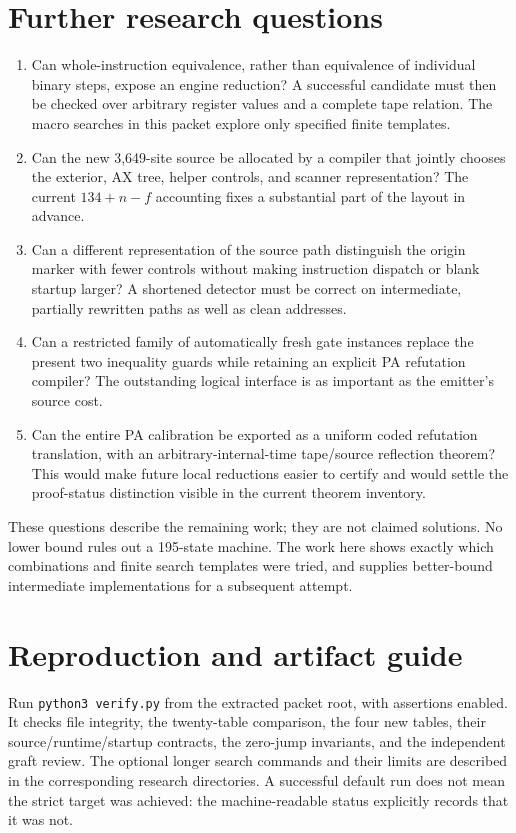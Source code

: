 \documentclass[11pt,letterpaper]{article}
\newcommand{\file}[1]{\texttt{\nolinkurl{#1}}}
\begin{document}


\section{Further research questions}

\begin{enumerate}
\item Can whole-instruction equivalence, rather than equivalence of
individual binary steps, expose an engine reduction? A successful
candidate must then be checked over arbitrary register values and a
complete tape relation. The macro searches in this packet explore only
specified finite templates.
\item Can the new 3,649-site source be allocated by a compiler that
jointly chooses the exterior, AX tree, helper controls, and scanner
representation? The current $134+n-f$ accounting fixes a substantial
part of the layout in advance.
\item Can a different representation of the source path distinguish
the origin marker with fewer controls without making instruction
dispatch or blank startup larger? A shortened detector must be correct
on intermediate, partially rewritten paths as well as clean addresses.
\item Can a restricted family of automatically fresh gate instances
replace the present two inequality guards while retaining an explicit
PA refutation compiler? The outstanding logical interface is as
important as the emitter's source cost.
\item Can the entire PA calibration be exported as a uniform coded
refutation translation, with an arbitrary-internal-time tape/source
reflection theorem? This would make future local reductions easier to
certify and would settle the proof-status distinction visible in the
current theorem inventory.
\end{enumerate}

These questions describe the remaining work; they are not claimed
solutions. No lower bound rules out a 195-state machine. The work here
shows exactly which combinations and finite search templates were tried,
and supplies better-bound intermediate implementations for a subsequent
attempt.

\section{Reproduction and artifact guide}

Run \file{python3 verify.py} from the extracted packet root, with assertions
enabled. It checks file integrity, the twenty-table comparison, the four
new tables, their source/runtime/startup contracts, the zero-jump
invariants, and the independent graft review. The optional longer search
commands and their limits are described in the corresponding research
directories. A successful default run does not mean the strict target
was achieved: the machine-readable status explicitly records that it
was not.
\end{document}
